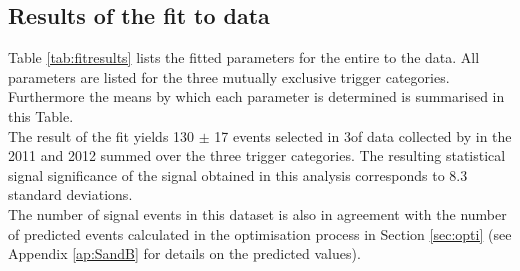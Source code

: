 %
\subsection{Results of the fit to \BdKstee \lhcb data}
Table \ref{tab:fitresults} lists the fitted parameters for the entire \PDF to the \BdKstee \lhcb data. All parameters are listed for the three mutually exclusive trigger categories. Furthermore the means by which each parameter is determined is summarised in this Table.\\
The result of the fit yields 130 $\pm$ 17 \BdKstee events selected in 3\invfb of data collected by \lhcb in the 2011 and 2012 summed over the three trigger categories. The resulting statistical signal significance of the signal obtained in this analysis corresponds to 8.3 standard deviations. \\
The number of \BdKstee signal events in this dataset is also in agreement with the number of predicted \BdKstee events calculated in the optimisation process in Section \ref{sec:opti} (see Appendix \ref{ap:SandB} for details on the predicted values). \newpage

